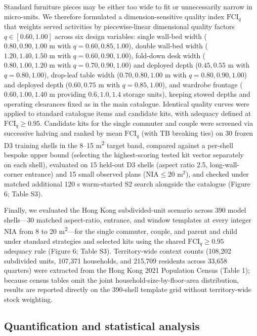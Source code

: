 \documentclass[12pt,letterpaper]{article}
\begin{document}
Standard furniture pieces may be either too wide to fit or unnecessarily narrow in micro-units. We therefore formulated a dimension-sensitive quality index \(\text{FCI}_q\) that weights served activities by piecewise-linear dimensional quality factors \(q \in [0.60, 1.00]\) across six design variables: single wall-bed width (\(0.80, 0.90, 1.00\text{ m}\) with \(q = 0.60, 0.85, 1.00\)), double wall-bed width (\(1.20, 1.40, 1.50\text{ m}\) with \(q = 0.60, 0.90, 1.00\)), fold-down desk width (\(0.80, 1.00, 1.20\text{ m}\) with \(q = 0.70, 0.90, 1.00\)) and deployed depth (\(0.45, 0.55\text{ m}\) with \(q = 0.80, 1.00\)), drop-leaf table width (\(0.70, 0.80, 1.00\text{ m}\) with \(q = 0.80, 0.90, 1.00\)) and deployed depth (\(0.60, 0.75\text{ m}\) with \(q = 0.85, 1.00\)), and wardrobe frontage (\(0.60, 1.00, 1.40\text{ m}\) providing \(0.6, 1.0, 1.4\) storage units), keeping stowed depths and operating clearances fixed as in the main catalogue. Identical quality curves were applied to standard catalogue items and candidate kits, with adequacy defined at \(\text{FCI}_q \ge 0.95\). Candidate kits for the single commuter and couple were screened via successive halving and ranked by mean \(\text{FCI}_q\) (with TB breaking ties) on 30 frozen D3 training shells in the 8--15 m\textsuperscript{2} target band, compared against a per-shell bespoke upper bound (selecting the highest-scoring tested kit vector separately on each shell), evaluated on 15 held-out D3 shells (aspect ratio 2.5, long-wall-corner entrance) and 15 small observed plans (\(\text{NIA} \le 20\text{ m}^2\)), and checked under matched additional 120 s warm-started S2 search alongside the catalogue (Figure 6; Table S3).

Finally, we evaluated the Hong Kong subdivided-unit scenario across 390 model shells---30 matched aspect-ratio, entrance, and window templates at every integer NIA from 8 to 20 m\textsuperscript{2}---for the single commuter, couple, and parent and child under standard strategies and selected kits using the shared \(\text{FCI}_q \ge 0.95\) adequacy rule (Figure 6; Table S3). Territory-wide context counts (108,202 subdivided units, 107,371 households, and 215,709 residents across 33,658 quarters) were extracted from the Hong Kong 2021 Population Census (Table 1); because census tables omit the joint household-size-by-floor-area distribution, results are reported directly on the 390-shell template grid without territory-wide stock weighting.

\subsection{Quantification and statistical analysis}\label{quantification-and-statistical-analysis}
\end{document}
